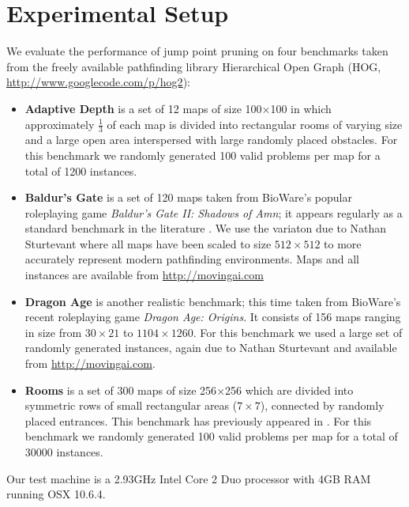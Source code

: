 \section{Experimental Setup}
\label{cha::jps::setup}
We evaluate the performance of jump point pruning on four benchmarks taken from the freely
available pathfinding library Hierarchical Open Graph
(HOG, \url{http://www.googlecode.com/p/hog2}): 
\begin{itemize}

\item{\textbf{Adaptive Depth}
is a set of 12 maps of size 100$\times$100 in which approximately $\frac{1}{3}$
of each map is divided into rectangular rooms of varying size and a large
open area interspersed with large randomly placed obstacles.
For this benchmark we randomly generated 100 valid problems per map for a 
total of 1200 instances.
} 

\item{\textbf{Baldur's Gate} is a set of 120 maps taken from BioWare's popular
roleplaying game \emph{Baldur's Gate II: Shadows of Amn}; it 
appears regularly as a standard benchmark in the literature
\cite{bjornsson06,harabor10,pochter10}.
We use the variaton due to Nathan Sturtevant where all maps have been scaled to size
$512\times512$ to more accurately represent modern pathfinding environments.
Maps and all instances are available from \url{http://movingai.com}
}

\item{\textbf{Dragon Age} is another realistic benchmark; this time taken from
BioWare's recent roleplaying game \emph{Dragon Age: Origins}.
It consists of 156 maps ranging in size 
from $30\times21$ to $1104\times1260$.
For this benchmark we used a large set of randomly generated instances,
again due to Nathan Sturtevant and available from \url{http://movingai.com}.
}

\item{\textbf{Rooms} is a set of 300 maps of size
256$\times$256 which are divided into symmetric rows of small rectangular areas
($7\times7$), connected by randomly placed entrances. This benchmark has
previously appeared in \cite{pochter10}.
For this benchmark we randomly generated 100 valid problems per map for a 
total of 30000 instances.
}
\end{itemize}

Our test machine is a 2.93GHz Intel Core 2 Duo processor with 4GB RAM running OSX 
10.6.4.  
